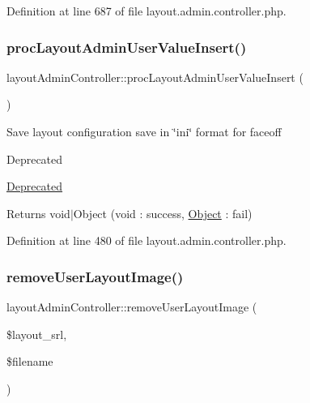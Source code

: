 Definition at line 687 of file layout.\+admin.\+controller.\+php.

\mbox{\label{classlayoutAdminController_a082aafb8b2911065e3bf5a025aa2be22}} 
\subsubsection{\texorpdfstring{proc\+Layout\+Admin\+User\+Value\+Insert()}{procLayoutAdminUserValueInsert()}}
{\footnotesize\ttfamily layout\+Admin\+Controller\+::proc\+Layout\+Admin\+User\+Value\+Insert (\begin{DoxyParamCaption}{ }\end{DoxyParamCaption})}

Save layout configuration save in \char`\"{}ini\char`\"{} format for faceoff \begin{DoxyRefDesc}{Deprecated}
\item[\hyperlink{deprecated__deprecated000016}{Deprecated}]\end{DoxyRefDesc}
\begin{DoxyReturn}{Returns}
void$\vert$\+Object (void \+: success, \hyperlink{classObject}{Object} \+: fail) 
\end{DoxyReturn}


Definition at line 480 of file layout.\+admin.\+controller.\+php.

\mbox{\label{classlayoutAdminController_a57ce8eb7e45c237bc9f20b2a2b9576c0}} 
\subsubsection{\texorpdfstring{remove\+User\+Layout\+Image()}{removeUserLayoutImage()}}
{\footnotesize\ttfamily layout\+Admin\+Controller\+::remove\+User\+Layout\+Image (\begin{DoxyParamCaption}\item[{}]{\$layout\+\_\+srl,  }\item[{}]{\$filename }\end{DoxyParamCaption})}

